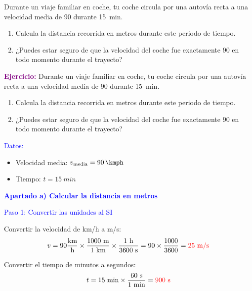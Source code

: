 \begin{exercise}
    Durante un viaje familiar en coche, tu coche circula por una autovía recta a una velocidad media de \qty{90}{\kmph} durante \qty{15}{min}.
    \begin{enumerate}[label=\letraminuscula]
        \item Calcula la distancia recorrida en metros durante este periodo de tiempo.
        \item ¿Puedes estar seguro de que la velocidad del coche fue exactamente \qty{90}{\kmph} en todo momento durante el trayecto?
    \end{enumerate}
    \begin{solu}
        \textbf{\textcolor{purple}{Ejercicio:}} Durante un viaje familiar en coche, tu coche circula por una autovía recta a una velocidad media de \qty{90}{\kmph} durante \qty{15}{min}.
        \begin{enumerate}[label=\letraminuscula]
            \item Calcula la distancia recorrida en metros durante este periodo de tiempo.
            \item ¿Puedes estar seguro de que la velocidad del coche fue exactamente \qty{90}{\kmph} en todo momento durante el trayecto?
        \end{enumerate}

        \vspace{0.3cm}

        \textcolor{blue}{Datos:}
        \begin{itemize}
            \item Velocidad media: $v_{\text{media}} = \qty{90}{\kmph}$
            \item Tiempo: $t = \qty{15}{min}$
        \end{itemize}

        \textbf{\textcolor{blue}{Apartado a) Calcular la distancia en metros}}

        \textcolor{blue}{Paso 1: Convertir las unidades al SI}

        Convertir la velocidad de km/h a m/s:
        \[
            v = 90 \frac{\text{km}}{\text{h}} \times \frac{1000 \text{ m}}{1 \text{ km}} \times \frac{1 \text{ h}}{3600 \text{ s}} = 90 \times \frac{1000}{3600} = \textcolor{red}{25 \text{ m/s}}
        \]

        Convertir el tiempo de minutos a segundos:
        \[
            t = 15 \text{ min} \times \frac{60 \text{ s}}{1 \text{ min}} = \textcolor{red}{900 \text{ s}}
        \]


\end{solu}
\end{exercise}
